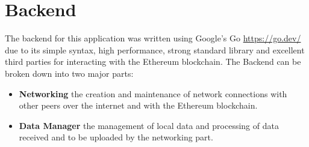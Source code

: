 \section{Backend}\label{subsec:backend}

The backend for this application was written using Google's Go \url{https://go.dev/} due to its simple syntax, high performance, strong standard library and excellent third parties for interacting with the Ethereum blockchain. The Backend can be broken down into two major parts:

\begin{itemize}
  \item \textbf{Networking} the creation and maintenance of network connections with other peers over the internet and with the Ethereum blockchain.
  \item \textbf{Data Manager} the management of local data and processing of data received and to be uploaded by the networking part.
\end{itemize}



